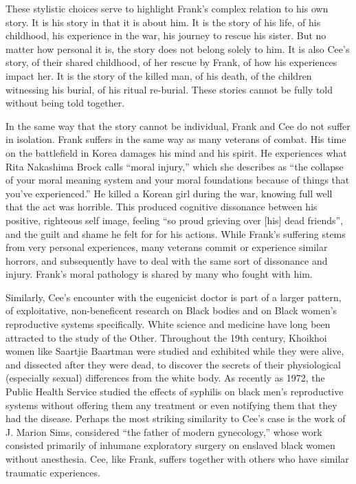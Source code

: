 \documentclass[12pt]{article}
\begin{document}
These stylistic choices serve to highlight Frank's complex relation to his own
story. It is his story in that it is about him. It is the story of his life, of
his childhood, his experience in the war, his journey to rescue his sister. But
no matter how personal it is, the story does not belong solely to him. It is
also Cee's story, of their shared childhood, of her rescue by Frank, of how his
experiences impact her. It is the story of the killed man, of his death, of the
children witnessing his burial, of his ritual re-burial. These stories cannot
be fully told without being told together.

In the same way that the story cannot be individual, Frank and Cee do not
suffer in isolation. Frank suffers in the same way as many veterans of combat.
His time on the battlefield in Korea damages his mind and his spirit. He
experiences what Rita Nakashima Brock calls ``moral injury,'' which she
describes as ``the collapse of your moral meaning system and your moral
foundations because of things that you've experienced.''\autocite{Brock15} He
killed a Korean girl during the war, knowing full well that the act was
horrible. This produced cognitive dissonance between his positive, righteous
self image, feeling ``so proud grieving over [his] dead friends'',\autocite[p.
133]{Morrison12} and the guilt and shame he felt for for his actions. While
Frank's suffering stems from very personal experiences, many veterans commit or
experience similar horrors, and subsequently have to deal with the same sort of
dissonance and injury. Frank's moral pathology is shared by many who fought
with him.

Similarly, Cee's encounter with the eugenicist doctor is part of a larger
pattern, of exploitative, non-beneficent research on Black bodies and on Black
women's reproductive systems specifically. White science and medicine have long
been attracted to the study of the Other. Throughout the 19th century, Khoikhoi
women like Saartjie Baartman were studied and exhibited while they were alive,
and dissected after they were dead, to discover the secrets of their
physiological (especially sexual) differences from the white
body.\autocite{Qureshi04} As recently as 1972, the Public Health Service
studied the effects of syphilis on black men's reproductive systems without
offering them any treatment or even notifying them that they had the disease.
Perhaps the most striking similarity to Cee's case is the work of J. Marion
Sims, considered ``the father of modern gynecology,'' whose work consisted
primarily of inhumane exploratory surgery on enslaved black women without
anesthesia.\autocite{Spettel11} Cee, like Frank, suffers together with others
who have similar traumatic experiences.
\end{document}
